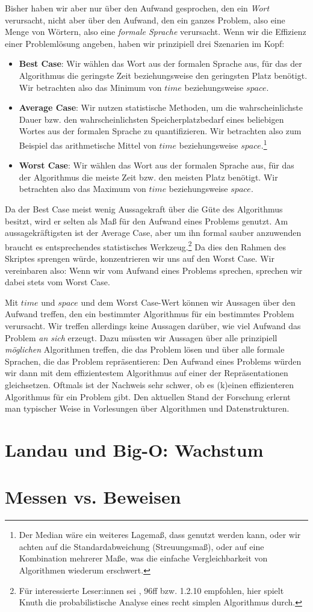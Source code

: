 Bisher haben wir aber nur über den Aufwand gesprochen,
den ein \emph{Wort} verursacht,
nicht aber über den Aufwand,
den ein ganzes Problem, also eine Menge von Wörtern,
also eine \emph{formale Sprache} verursacht.
Wenn wir die Effizienz einer Problemlösung angeben,
haben wir prinzipiell drei Szenarien im Kopf:
\begin{itemize}
    \item \textbf{Best Case}: Wir wählen das Wort aus der formalen Sprache aus,
        für das der Algorithmus die geringste Zeit
        beziehungsweise den geringsten Platz benötigt.
        Wir betrachten also das Minimum von $time$ beziehungsweise $space$.
    \item \textbf{Average Case}: Wir nutzen statistische Methoden, um die wahrscheinlichste
        Dauer bzw. den wahrscheinlichsten Speicherplatzbedarf eines beliebigen Wortes aus
        der formalen Sprache zu quantifizieren.
        Wir betrachten also zum Beispiel das arithmetische Mittel von $time$ beziehungsweise
        $space$.\footnote{Der Median wäre ein weiteres Lagemaß, dass genutzt werden kann,
        oder wir achten auf die Standardabweichung (Streuungsmaß), oder auf eine Kombination 
        mehrerer Maße, was die einfache Vergleichbarkeit von Algorithmen wiederum erschwert.}
    \item \textbf{Worst Case}: Wir wählen das Wort aus der formalen Sprache aus,
        für das der Algorithmus die meiste Zeit bzw. den meisten Platz benötigt.
        Wir betrachten also das Maximum von $time$ beziehungsweise $space$.
\end{itemize} 

Da der Best Case meist wenig Aussagekraft über die Güte des Algorithmus besitzt,
wird er selten als Maß für den Aufwand eines Problems genutzt.
Am aussagekräftigsten ist der Average Case,
aber um ihn formal sauber anzuwenden braucht es
entsprechendes statistisches Werkzeug.\footnote{
    Für interessierte Leser:innen sei \cite{knuth1}, 96ff bzw. 1.2.10 empfohlen,
    hier spielt Knuth die probabilistische Analyse eines recht simplen Algorithmus durch.} 
Da dies den Rahmen des Skriptes sprengen würde,
konzentrieren wir uns auf den Worst Case.
Wir vereinbaren also: Wenn wir vom Aufwand eines Problems sprechen,
sprechen wir dabei stets vom Worst Case.

Mit $time$ und $space$ und dem Worst Case-Wert können wir Aussagen über den Aufwand treffen,
den ein bestimmter Algorithmus für ein bestimmtes Problem verursacht.
Wir treffen allerdings keine Aussagen darüber,
wie viel Aufwand das Problem \emph{an sich} erzeugt.
Dazu müssten wir Aussagen über alle prinzipiell \emph{möglichen} Algorithmen treffen,
die das Problem lösen
und über alle formale Sprachen, die das Problem repräsentieren:
Den Aufwand eines Problems würden wir dann mit dem effizientestem Algorithmus 
auf einer der Repräsentationen gleichsetzen.
Oftmals ist der Nachweis sehr schwer, ob es (k)einen effizienteren Algorithmus
für ein Problem gibt.
Den aktuellen Stand der Forschung erlernt man typischer Weise in Vorlesungen über
Algorithmen und Datenstrukturen.

\section{Landau und Big-O: Wachstum}
\section{Messen vs. Beweisen}\label{messenVsBeweisen}

